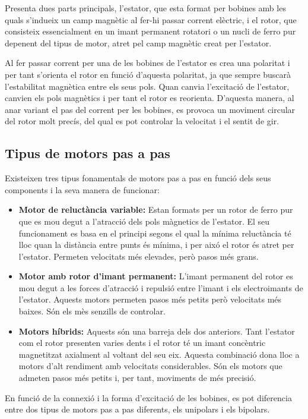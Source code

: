 Presenta dues parts principals, l'estator, que esta format per bobines amb les quals s'indueix un camp magnètic al fer-hi passar corrent elèctric, i el rotor, que consisteix essencialment en un imant permanent rotatori o un nucli de ferro pur depenent del tipus de motor, atret pel camp magnètic creat per l'estator. 


Al fer passar corrent per una de les bobines de l'estator es crea una polaritat i per tant s'orienta el rotor en funció d'aquesta polaritat, ja que sempre buscarà l'estabilitat magnètica entre els seus pols. Quan canvia l'excitació de l'estator, canvien els pols magnètics i per tant el rotor es reorienta. D'aquesta manera, al anar variant el pas del corrent per les bobines, es provoca un moviment circular del rotor molt precís, del qual es pot controlar la velocitat i el sentit de gir. 


\subsection{Tipus de motors pas a pas}
Existeixen tres tipus fonamentals de motors pas a pas en funció dels seus components i la seva manera de funcionar:

\begin{itemize}
	\item \textbf{Motor de reluctància variable:} Estan formats per un rotor de ferro pur que es mou degut a l'atracció dels pols màgnetics de l'estator. El seu funcionament es basa en el principi segons el qual la mínima reluctància té lloc quan la distància entre punts és mínima, i per aixó el rotor és atret per l'estator. Permeten velocitats més elevades, però pasos més grans.
	
	\item \textbf{Motor amb rotor d'imant permanent:} L'imant permanent del rotor es mou degut a les forces d'atracció i repulsió entre l'imant i els electroimants de l'estator. Aquests motors permeten pasos més petits però velocitats més baixes. Són els mès senzills de controlar.
	
	\item \textbf{Motors híbrids:} Aquests són una barreja dels dos anteriors. Tant l'estator com el rotor presenten varies dents i el rotor té un imant concèntric magnetitzat axialment al voltant del seu eix. Aquesta combinació dona lloc a motors d'alt rendiment amb velocitats considerables. Són els motors que admeten pasos més petits i, per tant, moviments de més precisió. 
\end{itemize}
En funció de la connexió i la forma d'excitació de les  bobines, es pot diferencia entre dos tipus de motors pas a pas diferents, els unipolars i els bipolars.

